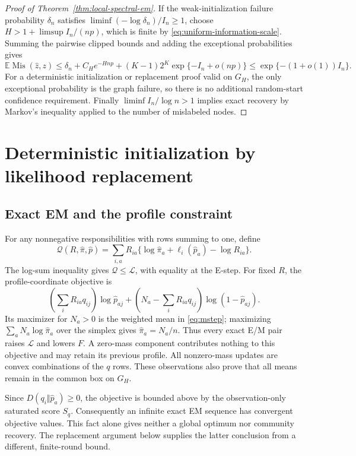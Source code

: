 \begin{proof}[Proof of Theorem~\ref{thm:local-spectral-em}]
If the weak-initialization failure probability $\delta_n$
satisfies
$\liminf(-\log\delta_n)/I_n\ge1$, choose
$H>1+\limsup I_n/(np)$, which is finite by
\eqref{eq:uniform-information-scale}.  Summing the pairwise
clipped bounds and adding the exceptional probabilities gives
\[
 \mathbb E\operatorname{Mis}(\widehat z,z)
 \le\delta_n+C_He^{-Hnp}
       +(K-1)2^K\exp\{-I_n+o(np)\}
 \le\exp\{-(1+o(1))I_n\}.
\]
For a deterministic initialization or replacement proof valid
on $G_H$, the only exceptional probability is the graph failure,
so there is no additional random-start confidence requirement.
Finally $\liminf I_n/\log n>1$ implies exact recovery by
Markov's inequality applied to the number of mislabeled nodes.
\end{proof}


\section{Deterministic initialization by likelihood replacement}
\label{app:replacement-proof}

\subsection{Exact EM and the profile constraint}
For any nonnegative responsibilities with rows summing to one, define
\[
 \mathcal Q(R,\widehat\pi,\widehat p)
 =\sum_{i,a}R_{ia}\{\log\widehat\pi_a+\ell_i(\widehat p_a)-\log R_{ia}\}.
\]
The log-sum inequality gives $\mathcal Q\le\mathcal L$, with equality at the E-step. For fixed $R$, the profile-coordinate objective is
\[
 \left(\sum_iR_{ia}q_{ij}\right)\log\widehat p_{aj}
 +\left(N_a-\sum_iR_{ia}q_{ij}\right)\log(1-\widehat p_{aj}).
\]
Its maximizer for $N_a>0$ is the weighted mean in \eqref{eq:mstep}; maximizing $\sum_aN_a\log\widehat\pi_a$ over the simplex gives $\widehat\pi_a=N_a/n$. Thus every exact E/M pair raises $\mathcal L$ and lowers $F$. A zero-mass component contributes nothing to this objective and may retain its previous profile. All nonzero-mass updates are convex combinations of the $q$ rows. These observations also prove that all means remain in the common box on $G_H$.

Since $D(q_i\Vert\widehat p_a)\ge0$, the objective is bounded above by the observation-only saturated score $S_q$. Consequently an infinite exact EM sequence has convergent objective values. This fact alone gives neither a global optimum nor community recovery. The replacement argument below supplies the latter conclusion from a different, finite-round bound.

